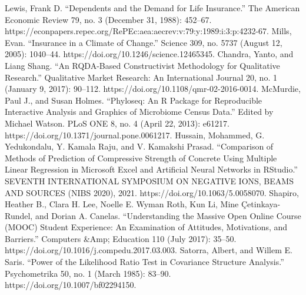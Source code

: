 \documentclass[journal]{IEEEtran}
\begin{document}
\begin{thebibliography}{1.7}
          \color{cyan} Lewis, Frank D. “Dependents and the Demand for Life Insurance.” The American Economic Review 79, no. 3 (December 31, 1988): 452–67. https://econpapers.repec.org/RePEc:aea:aecrev:v:79:y:1989:i:3:p:4232-67. \color{black}
          \color{cyan} Mills, Evan. “Insurance in a Climate of Change.” Science 309, no. 5737 (August 12, 2005): 1040–44. https://doi.org/10.1246/science.12465345. \color{black}
          \color{cyan} Chandra, Yanto, and Liang Shang. “An RQDA-Based Constructivist Methodology for Qualitative Research.” Qualitative Market Research: An International Journal 20, no. 1 (January 9, 2017): 90–112. https://doi.org/10.1108/qmr-02-2016-0014. \color{black}
          \color{cyan}McMurdie, Paul J., and Susan Holmes. “Phyloseq: An R Package for Reproducible Interactive Analysis and Graphics of Microbiome Census Data.” Edited by Michael Watson. PLoS ONE 8, no. 4 (April 22, 2013): e61217. https://doi.org/10.1371/journal.pone.0061217. \color{black}
           \color{cyan}Hussain, Mohammed, G. Yedukondalu, Y. Kamala Raju, and V. Kamakshi Prasad. “Comparison of Methods of Prediction of Compressive Strength of Concrete Using Multiple Linear Regression in Microsoft Excel and Artificial Neural Networks in RStudio.” SEVENTH INTERNATIONAL SYMPOSIUM ON NEGATIVE IONS, BEAMS AND SOURCES (NIBS 2020), 2021. https://doi.org/10.1063/5.0058070. \color{black}
          \color{cyan}Shapiro, Heather B., Clara H. Lee, Noelle E. Wyman Roth, Kun Li, Mine Çetinkaya-Rundel, and Dorian A. Canelas. “Understanding the Massive Open Online Course (MOOC) Student Experience: An Examination of Attitudes, Motivations, and Barriers.” Computers &Amp; Education 110 (July 2017): 35–50. https://doi.org/10.1016/j.compedu.2017.03.003. \color{black}
           \color{cyan}Satorra, Albert, and Willem E. Saris. “Power of the Likelihood Ratio Test in Covariance Structure Analysis.” Psychometrika 50, no. 1 (March 1985): 83–90. https://doi.org/10.1007/bf02294150.\color{black}
        
         

 
	
 

 
\end{thebibliography}
\end{document}
